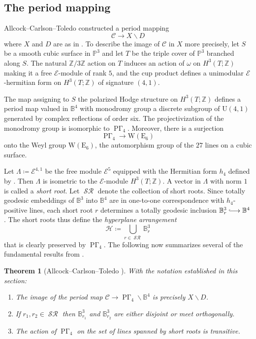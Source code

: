 \documentclass[11pt]{amsart}
\theoremstyle{plain}
\newtheorem{thm}{Theorem}[section]
\theoremstyle{definition}
\theoremstyle{remark}
\newcommand{\bbB}{\mathbb{B}}
\newcommand{\bbP}{\mathbb{P}}
\newcommand{\bbZ}{\mathbb{Z}}
\newcommand{\calC}{\mathcal{C}}
\newcommand{\calE}{\mathcal{E}}
\newcommand{\calH}{\mathcal{H}}
\newcommand{\Lam}{\Lambda}
\newcommand{\bs}{\backslash}
\newcommand{\lra}{\longrightarrow}
\newcommand{\ssm}{\smallsetminus}
\DeclareMathOperator{\PGam}{\mathrm{P}\Gamma}
\DeclareMathOperator{\SR}{\mathcal{SR}}
\begin{document}
\subsection{The period mapping}\label{periodmapsec}

Allcock--Carlson--Toledo \cite{ACT} constructed a period mapping 
	\[
		\calC\to X \ssm D
	\]
where $X$ and $D$ are as in . To describe the image of $\calC$ in $X$ more precisely, let $S$ be a smooth cubic surface in $\bbP^3$ and let $T$ be the triple cover of $\bbP^3$ branched along $S$. The natural $\bbZ / 3\bbZ$ action on $T$ induces an action of $\omega$ on $H^3(T;\bbZ)$ making it a free $\calE$-module of rank $5$, and the cup product defines a unimodular $\calE$-hermitian form on $H^3(T;\bbZ)$ of signature $(4,1)$.

The map assigning to $S$ the polarized Hodge structure on $H^3(T;\bbZ)$ defines a period map valued in $\bbB^4$ with monodromy group a discrete subgroup of $\mathrm{U}(4,1)$ generated by complex reflections of order six. The projectivization of the monodromy group is isomorphic to $\PGam_4$. Moreover, there is a surjection 
	\[
		\PGam_4\lra \mathrm{W}(\mathrm{E}_6)
	\]
onto the Weyl group $\mathrm{W}(\mathrm{E}_6)$, the automorphism group of the $27$ lines on a cubic surface.

Let $\Lam \coloneqq \calE^{4,1}$ be the free module $\calE^5$ equipped with the Hermitian form $h_4$ defined by . Then $\Lam$ is isometric to the $\calE$-module $H^3(T;\bbZ)$. A vector in $\Lam$ with norm $1$ is called a \emph{short root}. Let $\SR$ denote the collection of short roots. Since totally geodesic embeddings of $\bbB^3$ into $\bbB^4$ are in one-to-one correspondence with $h_4$-positive lines, each short root $r$ determines a totally geodesic inclusion $\bbB^3_r\lhook\joinrel\longrightarrow \bbB^4$. The short roots thus define the \emph{hyperplane arrangement}
	\[
		\calH \coloneqq \bigcup_{r\in \SR}\bbB^3_r
	\]
that is clearly preserved by $\PGam_4$. The following now summarizes several of the fundamental results from \cite{ACT}.

\begin{thm}[Allcock--Carlson--Toledo \cite{ACT}]\label{thm:ACTbig}
With the notation established in this section:
\begin{enumerate}

	\item The image of the period map $\calC \to \PGam_4 \bs \bbB^4$ is precisely $X \ssm D$.

	\item If $r_1, r_2 \in \SR$ then $\bbB^3_{r_1}$ and $\bbB^3_{r_2}$ are either disjoint or meet orthogonally.

	\item The action of $\PGam_4$ on the set of lines spanned by short roots is transitive.

\end{enumerate}
\end{thm}
\end{document}
